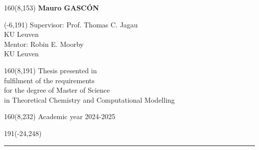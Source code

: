 \documentclass[12pt,a4paper,oneside]{book}
\begin{document}
%
\begin{textblock}{160}(8,153)
\textblockcolour{}
\vspace{-\parskip}
\flushright
\fontsize{14}{16}\selectfont \textbf{Mauro GASC{\'O}N}
\end{textblock}
%
\begin{textblock}{70}(-6,191)
\textblockcolour{}
\vspace{-\parskip}
\flushleft
Supervisor: Prof. Thomas C. Jagau\\[-2pt]
\textcolor{blueaff}{KU Leuven}\\[5pt]
Mentor: Robin E. Moorby\\[-2pt]
\textcolor{blueaff}{KU Leuven}\\
\end{textblock}
%
\begin{textblock}{160}(8,191)
\textblockcolour{}
\vspace{-\parskip}
\flushright
Thesis presented in\\[4.5pt]
fulfilment of the requirements\\[4.5pt]
for the degree of Master of Science\\[4.5pt]
in Theoretical Chemistry and Computational Modelling\\
\end{textblock}
%
\begin{textblock}{160}(8,232)
\textblockcolour{}
\vspace{-\parskip}
\flushright
Academic year 2024-2025
\end{textblock}
%
\begin{textblock}{191}(-24,248)
{\color{blueline}\rule{550pt}{5.5pt}}
\end{textblock}
%

\setcounter{page}{0}
\onehalfspacing


\rmfamily





\sffamily
\tableofcontents
\rmfamily

\newpage
\setcounter{page}{0}
\end{document}

